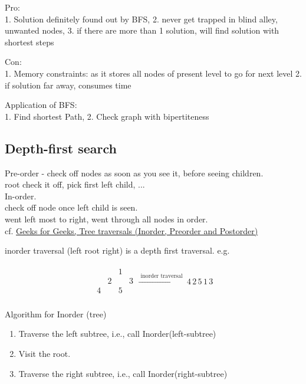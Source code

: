 \documentclass[10pt]{amsart}
\begin{document}
Pro: \\
1. Solution definitely found out by BFS, 2. never get trapped in blind alley, unwanted nodes, 3. if there are more than 1 solution, will find solution with shortest steps

Con: \\
1. Memory constraints: as it stores all nodes of present level to go for next level
2. if solution far away, consumes time

Application of BFS: \\
1. Find shortest Path,
2. Check graph with bipertiteness

\subsection{Depth-first search}

Pre-order - check off nodes as soon as you see it, before seeing children. \\
root check it off, pick first left child, ... \\

In-order. \\
check off node once left child is seen. \\
went left most to right, went through all nodes in order. \\

cf. \href{https://www.geeksforgeeks.org/tree-traversals-inorder-preorder-and-postorder/}{Geeks for Geeks, Tree traversals (Inorder, Preorder and Postorder)}

inorder traversal (left root right) is a depth first traversal. e.g.

\[
\begin{gathered}
\begin{matrix}
& & 1 & \\
& 2 & & 3 \\
4 & & 5 & \\
\end{matrix} \xrightarrow{ \text{ inorder traversal } } 4 \, 2 \, 5 \, 1 \, 3
\end{gathered}
\]

Algorithm for Inorder (tree)
\begin{enumerate}
	\item Traverse the left subtree, i.e., call Inorder(left-subtree)
	\item Visit the root.
	\item Traverse the right subtree, i.e., call Inorder(right-subtree)
\end{enumerate}
\end{document}
